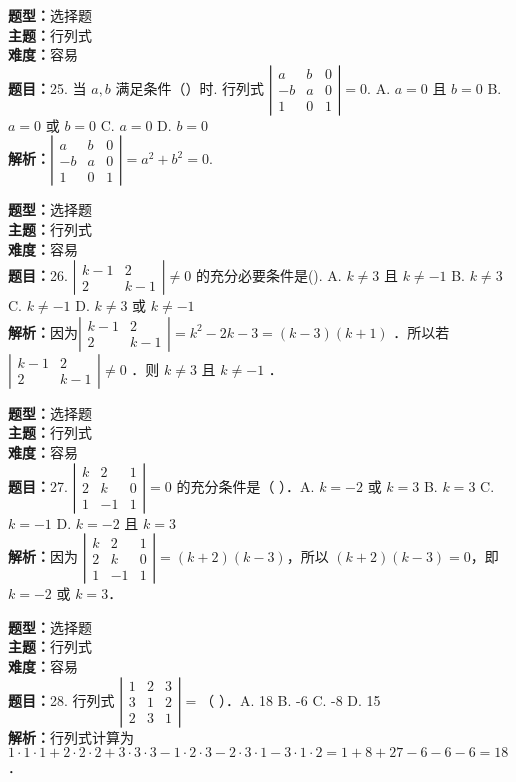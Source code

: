 \documentclass{ctexart}
\newenvironment{question}[5]{%
	\noindent\textbf{题型：}#1\\
	\textbf{主题：}#2\\
	\textbf{难度：}#3\\
	\textbf{题目：}#4\\
	\textbf{解析：}#5\\
	\vspace{1em}
}{}
\begin{document}
\begin{question}
	{选择题}
	{行列式}
	{容易}
	{25. 当 $a, b$ 满足条件（）时. 行列式 $\left|\begin{array}{lll}a & b & 0 \\ -b & a & 0 \\ 1 & 0 & 1\end{array}\right|=0.$ A. $a=0$ 且 $b=0$ B. $a=0$ 或 $b=0$ C. $a=0$ D. $b=0$}
	{$\left|\begin{array}{lll}a & b & 0 \\ -b & a & 0 \\ 1 & 0 & 1\end{array}\right|=a^2+b^2=0$.}
\end{question}

	\begin{question}
	{选择题}
	{行列式}
	{容易}
	{26. $\left|\begin{array}{cc}k-1 & 2 \\ 2 & k-1\end{array}\right| \neq 0$ 的充分必要条件是(). A. $k \neq 3$ 且 $k \neq-1$ B. $k \neq 3$ C. $k \neq-1$ D. $k \neq 3$ 或 $k \neq-1$}
	{因为$\left|\begin{array}{cc}k-1 & 2 \\ 2 & k-1\end{array}\right|=k^2-2 k-3=(k-3)(k+1)$ ．所以若 $\left|\begin{array}{cc}k-1 & 2 \\ 2 & k-1\end{array}\right| \neq 0$ ．则 $k \neq 3$ 且 $k \neq-1$ ．}
\end{question}


\begin{question}
	{选择题}
	{行列式}
	{容易}
	{27. $\left|\begin{array}{ccc}k & 2 & 1 \\ 2 & k & 0 \\ 1 & -1 & 1\end{array}\right|=0$ 的充分条件是（ ）．A. $k=-2$ 或 $k=3$ B. $k=3$ C. $k=-1$ D. $k=-2$ 且 $k=3$}
	{因为 $\left|\begin{array}{ccc}k & 2 & 1 \\ 2 & k & 0 \\ 1 & -1 & 1\end{array}\right|=(k+2)(k-3)$，所以 $(k+2)(k-3)=0$，即 $k=-2$ 或 $k=3$．}
\end{question}

\begin{question}
	{选择题}
	{行列式}
	{容易}
	{28. 行列式 $\left|\begin{array}{ccc}1 & 2 & 3 \\ 3 & 1 & 2 \\ 2 & 3 & 1\end{array}\right|=$（ ）．A. 18 B. -6 C. -8 D. 15}
	{行列式计算为 $1 \cdot 1 \cdot 1 + 2 \cdot 2 \cdot 2 + 3 \cdot 3 \cdot 3 - 1 \cdot 2 \cdot 3 - 2 \cdot 3 \cdot 1 - 3 \cdot 1 \cdot 2 = 1 + 8 + 27 - 6 - 6 - 6 = 18$．}
\end{question}
\end{document}
